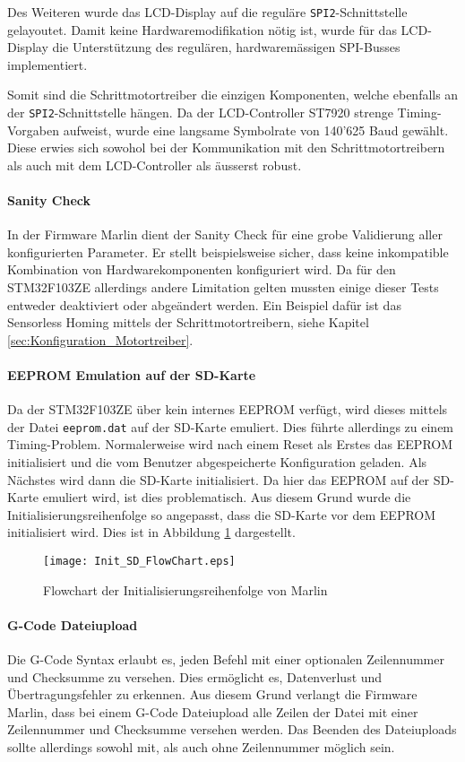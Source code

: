 Des Weiteren wurde das LCD-Display auf die reguläre \texttt{SPI2}-Schnittstelle gelayoutet. Damit keine Hardwaremodifikation nötig ist, wurde für das LCD-Display die Unterstützung des regulären, hardwaremässigen SPI-Busses implementiert.

Somit sind die Schrittmotortreiber die einzigen Komponenten, welche ebenfalls an der \texttt{SPI2}-Schnittstelle hängen. Da der LCD-Controller ST7920 strenge Timing-Vorgaben aufweist, wurde eine langsame Symbolrate von 140'625 Baud gewählt. Diese erwies sich sowohol bei der Kommunikation mit den Schrittmotortreibern als auch mit dem LCD-Controller als äusserst robust.

\paragraph{Sanity Check}
In der Firmware Marlin dient der Sanity Check für eine grobe Validierung aller konfigurierten Parameter. Er stellt beispielsweise sicher, dass keine inkompatible Kombination von  Hardwarekomponenten konfiguriert wird. Da für den STM32F103ZE allerdings andere Limitation gelten mussten einige dieser Tests entweder deaktiviert oder abgeändert werden. Ein Beispiel dafür ist das Sensorless Homing mittels der Schrittmotortreibern, siehe Kapitel \ref{sec:Konfiguration_Motortreiber}.

\paragraph{EEPROM Emulation auf der SD-Karte}
Da der STM32F103ZE über kein internes EEPROM verfügt, wird dieses mittels der Datei \texttt{eeprom.dat} auf der SD-Karte emuliert. Dies führte allerdings zu einem Timing-Problem.
Normalerweise wird nach einem Reset als Erstes das EEPROM initialisiert und die vom Benutzer abgespeicherte Konfiguration geladen. Als Nächstes wird dann die SD-Karte initialisiert. Da hier das EEPROM auf der SD-Karte emuliert wird, ist dies problematisch. Aus diesem Grund wurde die Initialisierungsreihenfolge so angepasst, dass die SD-Karte vor dem EEPROM initialisiert wird. Dies ist in Abbildung \ref{pic:EEPROM_Init} dargestellt.

\begin{figure}[H]
	\centering
	\texttt{[image: Init\_SD\_FlowChart.eps]}
	\caption{Flowchart der Initialisierungsreihenfolge von Marlin}
	\label{pic:EEPROM_Init}
\end{figure}

\paragraph{G-Code Dateiupload}
Die G-Code Syntax erlaubt es, jeden Befehl mit einer optionalen Zeilennummer und Checksumme zu versehen. Dies ermöglicht es, Datenverlust und Übertragungsfehler zu erkennen. Aus diesem Grund verlangt die Firmware Marlin, dass bei einem G-Code Dateiupload alle Zeilen der Datei mit einer Zeilennummer und Checksumme versehen werden. Das Beenden des Dateiuploads sollte allerdings sowohl mit, als auch ohne Zeilennummer möglich sein.

